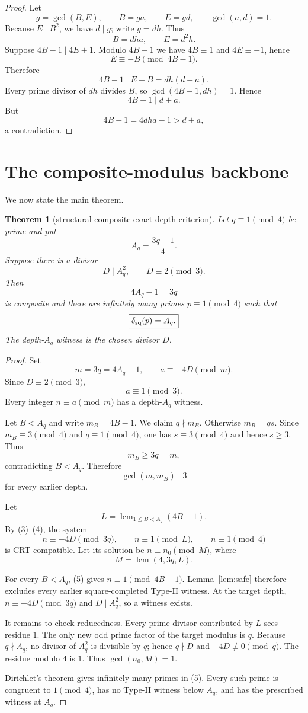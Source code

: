 \documentclass[11pt]{article}
\newtheorem{theorem}{Theorem}
\theoremstyle{definition}
\begin{document}
\begin{proof}
Let
\[
g=\gcd(B,E),\qquad B=ga,\qquad E=gd,\qquad\gcd(a,d)=1.
\]
Because $E\mid B^2$, we have $d\mid g$; write $g=dh$.  Thus
\[
B=dha,\qquad E=d^2h.
\]
Suppose $4B-1\mid4E+1$.  Modulo $4B-1$ we have $4B\equiv1$ and $4E\equiv-1$, hence
\[
E\equiv-B\pmod{4B-1}.
\]
Therefore
\[
4B-1\mid E+B=dh(d+a).
\]
Every prime divisor of $dh$ divides $B$, so $\gcd(4B-1,dh)=1$.  Hence
\[
4B-1\mid d+a.
\]
But
\[
4B-1=4dha-1>d+a,
\]
a contradiction.
\end{proof}

\section{The composite-modulus backbone}
We now state the main theorem.

\begin{theorem}[structural composite exact-depth criterion]\label{thm:main}
Let $q\equiv1\pmod4$ be prime and put
\[
A_q=\frac{3q+1}{4}.
\]
Suppose there is a divisor
\[
D\mid A_q^2,\qquad D\equiv2\pmod3.
\]
Then
\[
4A_q-1=3q
\]
is composite and there are infinitely many primes $p\equiv1\pmod4$ such that
\[
\boxed{\delta_{\rm sq}(p)=A_q.}
\]
The depth-$A_q$ witness is the chosen divisor $D$.
\end{theorem}

\begin{proof}
Set
\[
m=3q=4A_q-1,
\qquad a\equiv-4D\pmod m.
\]
Since $D\equiv2\pmod3$,
\[
a\equiv1\pmod3. \tag{3}
\]
Every integer $n\equiv a\pmod m$ has a depth-$A_q$ witness.

Let $B<A_q$ and write $m_B=4B-1$.  We claim $q\nmid m_B$.  Otherwise $m_B=qs$.  Since $m_B\equiv3\pmod4$ and $q\equiv1\pmod4$, one has $s\equiv3\pmod4$ and hence $s\ge3$.  Thus
\[
m_B\ge3q=m,
\]
contradicting $B<A_q$.  Therefore
\[
\gcd(m,m_B)\mid3 \tag{4}
\]
for every earlier depth.

Let
\[
L=\operatorname{lcm}_{1\le B<A_q}(4B-1).
\]
By (3)--(4), the system
\[
n\equiv-4D\pmod{3q},
\qquad
n\equiv1\pmod L,
\qquad
n\equiv1\pmod4 \tag{5}
\]
is CRT-compatible.  Let its solution be $n\equiv n_0\pmod M$, where
\[
M=\operatorname{lcm}(4,3q,L).
\]

For every $B<A_q$, (5) gives $n\equiv1\pmod{4B-1}$.  Lemma~\ref{lem:safe} therefore excludes every earlier square-completed Type-II witness.  At the target depth, $n\equiv-4D\pmod{3q}$ and $D\mid A_q^2$, so a witness exists.

It remains to check reducedness.  Every prime divisor contributed by $L$ sees residue $1$.  The only new odd prime factor of the target modulus is $q$.  Because $q\nmid A_q$, no divisor of $A_q^2$ is divisible by $q$; hence $q\nmid D$ and $-4D\not\equiv0\pmod q$.  The residue modulo $4$ is $1$.  Thus $\gcd(n_0,M)=1$.

Dirichlet's theorem gives infinitely many primes in (5).  Every such prime is congruent to $1\pmod4$, has no Type-II witness below $A_q$, and has the prescribed witness at $A_q$.
\end{proof}
\end{document}
